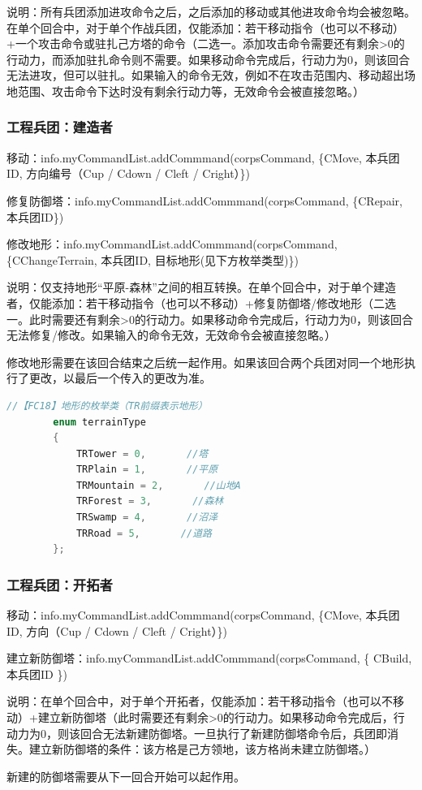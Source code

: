 \documentclass[a4paper,4pt]{article}
\begin{document}
说明：所有兵团添加进攻命令之后，之后添加的移动或其他进攻命令均会被忽略。在单个回合中，对于单个作战兵团，仅能添加：若干移动指令（也可以不移动）+一个攻击命令或驻扎己方塔的命令（二选一。添加攻击命令需要还有剩余>0的行动力，而添加驻扎命令则不需要。如果移动命令完成后，行动力为0，则该回合无法进攻，但可以驻扎。如果输入的命令无效，例如不在攻击范围内、移动超出场地范围、攻击命令下达时没有剩余行动力等，无效命令会被直接忽略。）

\subsubsection{工程兵团：建造者}
移动：info.myCommandList.addCommmand(corpsCommand, \{CMove, 本兵团ID, 方向编号（Cup / Cdown / Cleft / Cright）\})\par
修复防御塔：info.myCommandList.addCommmand(corpsCommand, \{CRepair, 本兵团ID\})\par
修改地形：info.myCommandList.addCommmand(corpsCommand, \{CChangeTerrain, 本兵团ID, 目标地形(见下方枚举类型)\})\par
说明：仅支持地形“平原-森林”之间的相互转换。在单个回合中，对于单个建造者，仅能添加：若干移动指令（也可以不移动）+修复防御塔/修改地形（二选一。此时需要还有剩余>0的行动力。如果移动命令完成后，行动力为0，则该回合无法修复/修改。如果输入的命令无效，无效命令会被直接忽略。）\par
修改地形需要在该回合结束之后统一起作用。如果该回合两个兵团对同一个地形执行了更改，以最后一个传入的更改为准。
\begin{lstlisting}[language={C++},title={生产任务类型}]  %插入代码块
		//【FC18】地形的枚举类（TR前缀表示地形）
		enum terrainType
		{
			TRTower = 0,       //塔
			TRPlain = 1,       //平原
			TRMountain = 2,       //山地A
			TRForest = 3,       //森林
			TRSwamp = 4,       //沼泽
			TRRoad = 5,       //道路
		};
\end{lstlisting}
\subsubsection{工程兵团：开拓者}
移动：info.myCommandList.addCommmand(corpsCommand, \{CMove, 本兵团ID, 方向（Cup / Cdown / Cleft / Cright）\})\par
建立新防御塔：info.myCommandList.addCommmand(corpsCommand, \{ CBuild, 本兵团ID \})\par
说明：在单个回合中，对于单个开拓者，仅能添加：若干移动指令（也可以不移动）+建立新防御塔（此时需要还有剩余>0的行动力。如果移动命令完成后，行动力为0，则该回合无法新建防御塔。一旦执行了新建防御塔命令后，兵团即消失。建立新防御塔的条件：该方格是己方领地，该方格尚未建立防御塔。）\par
新建的防御塔需要从下一回合开始可以起作用。
\end{document}
